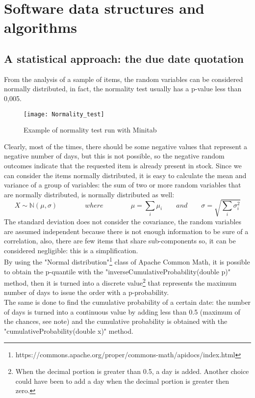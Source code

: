 \documentclass[a4paper,12pt]{article}
\begin{document}
\newpage
\section{Software data structures and algorithms}

\subsection{A statistical approach: the due date quotation}
From the analysis of a sample of items, the random variables can be considered normally distributed, in fact, the normality test usually has a p-value less than 0,005.\\
\begin{figure}[H]
	\begin{center}
		\texttt{[image: Normality\_test]}
		\caption{Example of normality test run with Minitab\textcopyright}
	\end{center}
\end{figure}
 Clearly, most of the times, there should be some negative values that represent a negative number of days, but this is not possible, so the negative random outcomes indicate that the requested item is already present in stock. Since we can consider the items normally distributed, it is easy to calculate the mean and variance of a group of variables: the sum of two or more random variables that are normally distributed, is normally distributed as well:
\begin{equation*}
X \sim \mathbb{N}(\mu, \sigma)		\qquad \qquad where \qquad \qquad		\mu = \sum_{i} \mu_{i} 		 \qquad and\qquad			\sigma = \sqrt{\sum_{i} \sigma_{i}^{2}}
\end{equation*}
The standard deviation does not consider the covariance, the random variables are assumed independent because there is not enough information to be sure of a correlation, also, there are few items that share sub-components so, it can be considered negligible: this is a simplification. \\

By using the "Normal distribution"\footnote{https://commons.apache.org/proper/commons-math/apidocs/index.html} class of Apache Common Math, it is possible to obtain the p-quantile with the "inverseCumulativeProbability(double p)" method, then it is turned into a discrete value\footnote{When the decimal portion is greater than 0.5, a day is added. Another choice could have been to add a day when the decimal portion is greater then zero.} that represents the maximum number of days to issue the order with a p-probability. \\
The same is done to find the cumulative probability of a certain date: the number of days is turned into a continuous value by adding less than 0.5 (maximum of the chances, see note) and the cumulative probability is obtained with the "cumulativeProbability(double x)" method.
\end{document}
